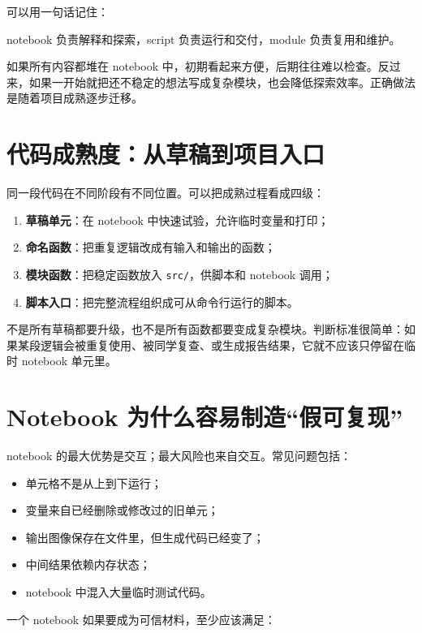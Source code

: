可以用一句话记住：

\begin{center}
notebook 负责解释和探索，script 负责运行和交付，module 负责复用和维护。
\end{center}

如果所有内容都堆在 notebook 中，初期看起来方便，后期往往难以检查。反过来，如果一开始就把还不稳定的想法写成复杂模块，也会降低探索效率。正确做法是随着项目成熟逐步迁移。

\section{代码成熟度：从草稿到项目入口}

同一段代码在不同阶段有不同位置。可以把成熟过程看成四级：

\begin{enumerate}
    \item \textbf{草稿单元}：在 notebook 中快速试验，允许临时变量和打印；
    \item \textbf{命名函数}：把重复逻辑改成有输入和输出的函数；
    \item \textbf{模块函数}：把稳定函数放入 \texttt{src/}，供脚本和 notebook 调用；
    \item \textbf{脚本入口}：把完整流程组织成可从命令行运行的脚本。
\end{enumerate}

不是所有草稿都要升级，也不是所有函数都要变成复杂模块。判断标准很简单：如果某段逻辑会被重复使用、被同学复查、或生成报告结果，它就不应该只停留在临时 notebook 单元里。

\section{Notebook 为什么容易制造“假可复现”}

notebook 的最大优势是交互；最大风险也来自交互。常见问题包括：

\begin{itemize}
    \item 单元格不是从上到下运行；
    \item 变量来自已经删除或修改过的旧单元；
    \item 输出图像保存在文件里，但生成代码已经变了；
    \item 中间结果依赖内存状态；
    \item notebook 中混入大量临时测试代码。
\end{itemize}

一个 notebook 如果要成为可信材料，至少应该满足：


